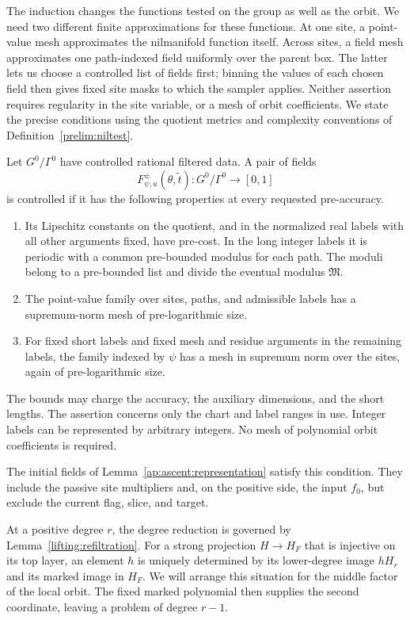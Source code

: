 The induction changes the functions tested on the group as well as the
orbit.  We need two different finite approximations for these functions.
At one site, a point-value mesh approximates the nilmanifold function
itself.  Across sites, a field mesh approximates one path-indexed field
uniformly over the parent box.  The latter lets us choose a controlled
list of fields first; binning the values of each chosen field then
gives fixed site masks to which the sampler applies.  Neither assertion
requires regularity in the site variable, or a mesh of orbit
coefficients.  We state the precise conditions using the quotient
metrics and complexity conventions of Definition~\ref{prelim:niltest}.

\begin{definition}\label{ap:active:fields}
Let $G^0/\Gamma^0$ have controlled rational filtered data.  A pair of
fields
\[
 F^{\pm}_{\psi,u}(\theta,\widetilde t)
       :G^0/\Gamma^0\longrightarrow[0,1]
\]
is controlled if it has the following properties at every requested
pre-accuracy.
\begin{enumerate}
\item Its Lipschitz constants on the quotient, and in the normalized
real labels with all other arguments fixed, have pre-cost.  In the
long integer labels it is periodic with a common pre-bounded modulus
for each path.  The moduli belong to a pre-bounded list and divide the
eventual modulus $\mathfrak M$.
\item The point-value family over sites, paths, and admissible labels
has a supremum-norm mesh of pre-logarithmic size.
\item For fixed short labels and fixed mesh and residue arguments in
the remaining labels, the family indexed by $\psi$ has a mesh in
supremum norm over the sites, again of pre-logarithmic size.
\end{enumerate}
The bounds may charge the accuracy, the auxiliary dimensions, and
the short lengths.  The assertion concerns only the chart and label
ranges in use.  Integer labels can be represented by arbitrary
integers.  No mesh of polynomial orbit coefficients is required.
\end{definition}

The initial fields of Lemma~\ref{ap:ascent:representation}
satisfy this condition.  They include the passive site multipliers
and, on the positive side, the input $f_0$, but exclude the current
flag, slice, and target.

At a positive degree $r$, the degree reduction is governed by
Lemma~\ref{lifting:refiltration}.  For a strong projection
$H\to H_F$ that is injective on its top layer, an element $h$ is
uniquely determined by its lower-degree image $hH_r$ and its marked
image in $H_F$.  We will arrange this situation for the middle factor
of the local orbit.  The fixed marked polynomial then supplies the
second coordinate, leaving a problem of degree $r-1$.

